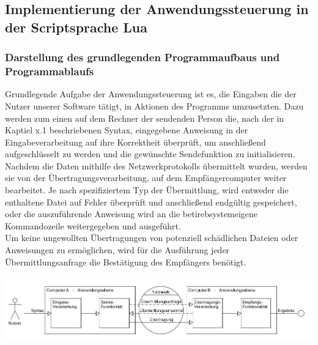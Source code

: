 \documentclass[12pt, a4paper]{scrartcl}
\begin{document}
\subsection{Implementierung der Anwendungssteuerung in der Scriptsprache Lua}

\subsubsection{Darstellung des grundlegenden Programmaufbaus und Programmablaufs}
Grundlegende Aufgabe der Anwendungssteuerung ist es, die Eingaben die der Nutzer unserer Software tätigt, in Aktionen des Programms umzusetzten. Dazu werden zum einen auf dem Rechner der sendenden Person die, nach der in Kaptiel x.1 beschriebenen Syntax, eingegebene Anweisung in der Eingabeverarbeitung auf ihre Korrektheit überprüft, um anschließend aufgeschlüsselt zu werden und die gewünschte Sendefunktion zu initialisieren.\\
Nachdem die Daten mithilfe des Netzwerkprotokolls übermittelt wurden, werden sie von der Übertragungsverarbeitung, auf dem Empfängercomputer weiter bearbeitet. Je nach spezifiziertem Typ der Übermittlung, wird entweder die enthaltene Datei auf Fehler überprüft und anschließend endgültig gespeichert, oder die auszuführende Anweisung wird an die betirebsystemeigene Kommandozeile weitergegeben und ausgeführt.\\
Um keine ungewollten Übertragungen von potenziell schädlichen Dateien oder Anweisungen zu ermöglichen, wird für die Ausführung jeder Übermittlungsanfrage die Bestätigung des Empfängers benötigt.\\\hfill\\
\includegraphics[scale=.45]{anw.jpg}
\end{document}
